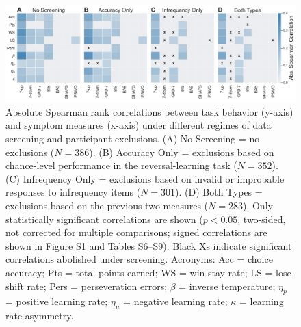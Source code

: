 \documentclass[a4paper,notitlepage,12pt]{article}
\begin{document}
\clearpage
\begin{figure}[h]
    \includegraphics[width=17cm]{../figures/main_03a.png}
    \centering
    \caption{Absolute Spearman rank correlations between task behavior (y-axis) and symptom measures (x-axis) under different regimes of data screening and participant exclusions. (A) No Screening = no exclusions ($N=386$). (B) Accuracy Only = exclusions based on chance-level performance in the reversal-learning task ($N=352$). (C) Infrequency Only = exclusions based on invalid or improbable responses to infrequency items ($N=301$). (D) Both Types = exclusions based on the previous two measures ($N=283$). Only statistically significant correlations are shown ($p<0.05$, two-sided, not corrected for multiple comparisons; signed correlations are shown in Figure S1 and Tables S6--S9). Black Xs indicate significant correlations abolished under screening. Acronyms: Acc = choice accuracy; Pts = total points earned; WS = win-stay rate; LS = lose-shift rate; Pers = perseveration errors; $\beta$ = inverse temperature; $\eta_p$ = positive learning rate; $\eta_n$ = negative learning rate; $\kappa$ = learning rate asymmetry.}
    \label{fig:fig03}
\end{figure}
\end{document}
